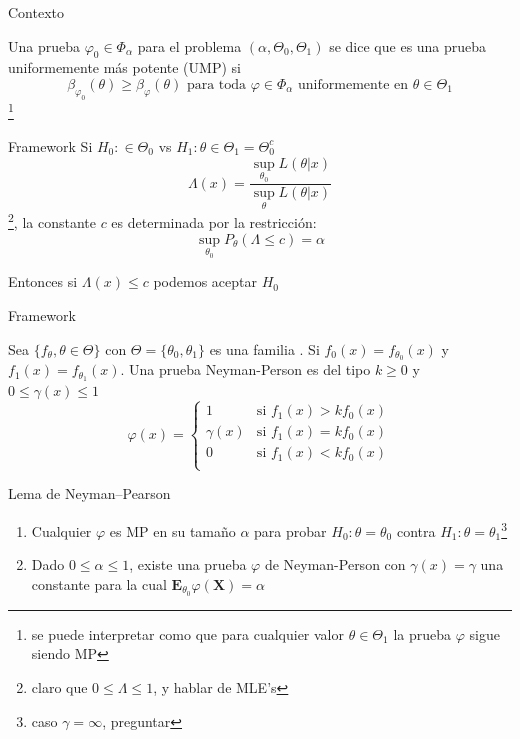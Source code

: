 \documentclass{beamer}
\begin{document}
\begin{frame}{Contexto}
\begin{definition}
 Una prueba $\varphi_0 \in \Phi_\alpha$ para el problema $(\alpha, \Theta_0, \Theta_1)$ se dice que es una prueba uniformemente más potente (UMP) si
\[
\beta_{\varphi_0}(\theta) \geq \beta_\varphi(\theta) \textrm{          para toda     }  \varphi \in \Phi_\alpha  \textrm{ uniformemente en } \theta \in \Theta_1
\]
\footnote{ se puede interpretar como que para cualquier valor $\theta \in \Theta_1$ la prueba $\varphi$ sigue siendo MP}
\end{definition}

\end{frame}

\begin{frame}{Framework}
Si $H_0 : \in \Theta_0$ vs $H_1: \theta \in \Theta_1 = \Theta_0^c$  
\begin{equation}\label{1}
\Lambda(x) = \frac{ \sup_{\theta_0} L(\theta | x)}{\sup_{\theta} L(\theta | x)}
\end{equation}
\footnote{ claro que $0 \leq \Lambda \leq 1$, y hablar de MLE's}, la constante $c$ es determinada por la restricción: 
\[
\sup_{\theta_0} P_\theta ( \Lambda \leq c) = \alpha
\]

Entonces si $\Lambda(x) \leq c$ podemos aceptar $H_0$ 
\end{frame}



\begin{frame}{Framework}
\begin{definition}
Sea $\{f_\theta , \theta \in \Theta \}$ con $\Theta = \{\theta_0,\theta_1\}$ es una familia . Si $f_0(x)=f_{\theta_0}(x)$ y $f_1(x)=f_{\theta_1}(x)$.
Una prueba Neyman-Person es del tipo $k\geq 0$ y $0 \leq \gamma(x) \leq 1$ 	\[
			\varphi(x)= \left\{ \begin{array}{lr}
							1 &	\textrm{si  } f_1(x) > kf_0(x) \\
							\gamma(x)  & \textrm{si  } f_1(x) = kf_0(x) \\ 
							0 & \textrm{si  } f_1(x) < kf_0(x) \\
							\end{array}
					\right.
		\] 
\end{definition}
\begin{theorem}{ \small{Lema de Neyman–Pearson}} 
\begin{enumerate}
\item Cualquier $\varphi$ es MP en su tamaño $\alpha$ para probar $H_0: \theta = \theta_0$ contra $H_1: \theta = \theta_1$\footnote{caso $\gamma=\infty$, preguntar}
\item Dado $0 \leq \alpha \leq 1$, existe una prueba  $\varphi$ de Neyman-Person con $\gamma(x) = \gamma$ una constante para la cual $\mathbf{E}_{\theta_0}\varphi(\mathbf{X} )= \alpha$  
\end{enumerate}
\end{theorem}
\end{frame}
\end{document}
